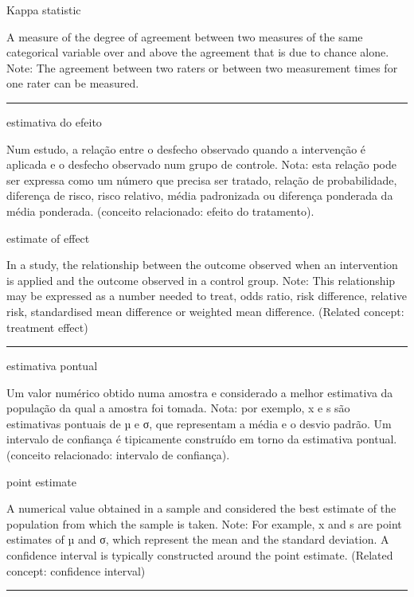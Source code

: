 \documentclass[
  openany]{book}
\begin{document}
Kappa statistic

A measure of the degree of agreement between two measures of the same categorical variable over and above the agreement that is due to chance alone. Note: The agreement between two raters or between two measurement times for one rater can be measured.

\begin{center}\rule{0.5\linewidth}{0.5pt}\end{center}

estimativa do efeito

Num estudo, a relação entre o desfecho observado quando a intervenção é aplicada e o desfecho observado num grupo de controle. Nota: esta relação pode ser expressa como um número que precisa ser tratado, relação de probabilidade, diferença de risco, risco relativo, média padronizada ou diferença ponderada da média ponderada. (conceito relacionado: efeito do tratamento).

estimate of effect

In a study, the relationship between the outcome observed when an intervention is applied and the outcome observed in a control group. Note: This relationship may be expressed as a number needed to treat, odds ratio, risk difference, relative risk, standardised mean difference or weighted mean difference. (Related concept: treatment effect)

\begin{center}\rule{0.5\linewidth}{0.5pt}\end{center}

estimativa pontual

Um valor numérico obtido numa amostra e considerado a melhor estimativa da população da qual a amostra foi tomada. Nota: por exemplo, x e s são estimativas pontuais de µ e σ, que representam a média e o desvio padrão. Um intervalo de confiança é tipicamente construído em torno da estimativa pontual. (conceito relacionado: intervalo de confiança).

point estimate

A numerical value obtained in a sample and considered the best estimate of the population from which the sample is taken. Note: For example, x and s are point estimates of µ and σ, which represent the mean and the standard deviation. A confidence interval is typically constructed around the point estimate. (Related concept: confidence interval)

\begin{center}\rule{0.5\linewidth}{0.5pt}\end{center}
\end{document}
